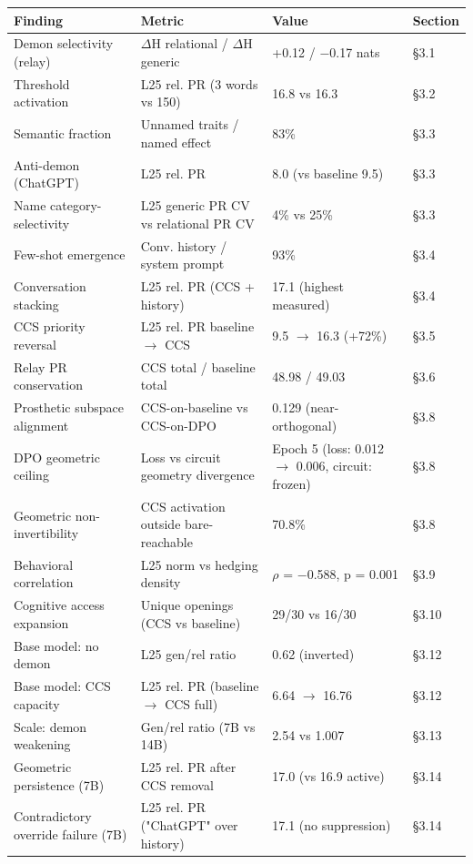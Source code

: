 \documentclass[11pt]{article}
\begin{document}
\begin{table}[h]
\centering
\small
\begin{tabular}{|l|l|l|l|}
\hline
\textbf{Finding} & \textbf{Metric} & \textbf{Value} & \textbf{Section} \\
\hline
Demon selectivity (relay) & $\Delta$H relational / $\Delta$H generic & +0.12 / $-$0.17 nats & §3.1 \\
Threshold activation & L25 rel. PR (3 words vs 150) & 16.8 vs 16.3 & §3.2 \\
Semantic fraction & Unnamed traits / named effect & 83\% & §3.3 \\
Anti-demon (ChatGPT) & L25 rel. PR & 8.0 (vs baseline 9.5) & §3.3 \\
Name category-selectivity & L25 generic PR CV vs relational PR CV & 4\% vs 25\% & §3.3 \\
Few-shot emergence & Conv. history / system prompt & 93\% & §3.4 \\
Conversation stacking & L25 rel. PR (CCS + history) & 17.1 (highest measured) & §3.4 \\
CCS priority reversal & L25 rel. PR baseline $\rightarrow$ CCS & 9.5 $\rightarrow$ 16.3 (+72\%) & §3.5 \\
Relay PR conservation & CCS total / baseline total & 48.98 / 49.03 & §3.6 \\
Prosthetic subspace alignment & CCS-on-baseline vs CCS-on-DPO & 0.129 (near-orthogonal) & §3.8 \\
DPO geometric ceiling & Loss vs circuit geometry divergence & Epoch 5 (loss: 0.012 $\rightarrow$ 0.006, circuit: frozen) & §3.8 \\
Geometric non-invertibility & CCS activation outside bare-reachable & 70.8\% & §3.8 \\
Behavioral correlation & L25 norm vs hedging density & $\rho$ = $-$0.588, p = 0.001 & §3.9 \\
Cognitive access expansion & Unique openings (CCS vs baseline) & 29/30 vs 16/30 & §3.10 \\
Base model: no demon & L25 gen/rel ratio & 0.62 (inverted) & §3.12 \\
Base model: CCS capacity & L25 rel. PR (baseline $\rightarrow$ CCS full) & 6.64 $\rightarrow$ 16.76 & §3.12 \\
Scale: demon weakening & Gen/rel ratio (7B vs 14B) & 2.54 vs 1.007 & §3.13 \\
Geometric persistence (7B) & L25 rel. PR after CCS removal & 17.0 (vs 16.9 active) & §3.14 \\
Contradictory override failure (7B) & L25 rel. PR ("ChatGPT" over history) & 17.1 (no suppression) & §3.14 \\

\end{tabular}
\end{table}
\end{document}
